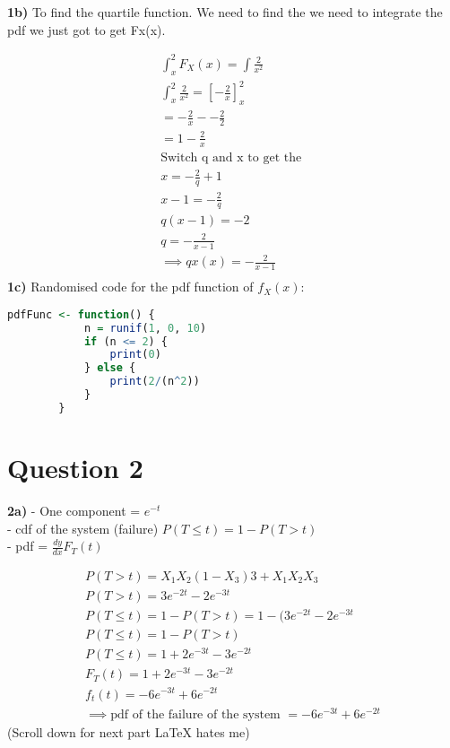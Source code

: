 \documentclass[oneside, a4paper]{article}
\begin{document}
\textbf{1b)} To find the quartile function. We need to find the we need to integrate the pdf we just got to get Fx(x). 

\begin{equation}
    \begin{split}
    \int^2_x F_X(x) = \int \frac{2}{x^2} \\
    \int^2_x \frac{2}{x^2} = \left[ - \frac{2}{x} \right]_x^2 \\
    = - \frac{2}{x} - -\frac{2}{2} \\
    = 1 - \frac{2}{x} \\
    \text{Switch q and x to get the } \\ 
    x = - \frac{2}{q} + 1 \\
    x - 1 =  - \frac{2}{q} \\
    q (x - 1) = -2 \\
    q = - \frac{2}{x - 1} \\
    \implies qx(x) = - \frac{2}{x - 1} \\
    \end{split}
\end{equation} 
\textbf{1c)} Randomised code for the pdf function of $f_X(x)$:
    \begin{lstlisting}[language=R]
        pdfFunc <- function() {
            n = runif(1, 0, 10)
            if (n <= 2) {
                print(0)
            } else {
                print(2/(n^2))
            }
        }        
    \end{lstlisting}
    
\section{Question 2}

\textbf{2a)} 
- One component = $e^{-t}$ \\
- cdf of the system (failure) $P(T \leq t) = 1- P(T>t)$ \\
- pdf = $\frac{dy}{dx} F_T(t)$

\begin{equation}
    \begin{split}
        P(T>t) = X_1X_2(1-X_3)3 + X_1X_2X_3 \\
        P(T>t) = 3e^{-2t} -2e^{-3t} \\
        P(T \leq t) = 1- P(T>t) = 1 - (3e^{-2t} -2e^{-3t} \\
        P(T \leq t) = 1 - P(T > t) \\
        P(T \leq t) = 1 + 2e^{-3t} - 3e^{-2t} \\
        F_T(t) = 1 + 2e^{-3t} - 3e^{-2t} \\
        f_t(t) = -6e^{-3t} + 6e^{-2t} \\
        \implies \text{pdf of the failure of the system } = -6e^{-3t} + 6e^{-2t}
    \end{split}
\end{equation}
(Scroll down for next part \LaTeX \: hates me)
\end{document}
